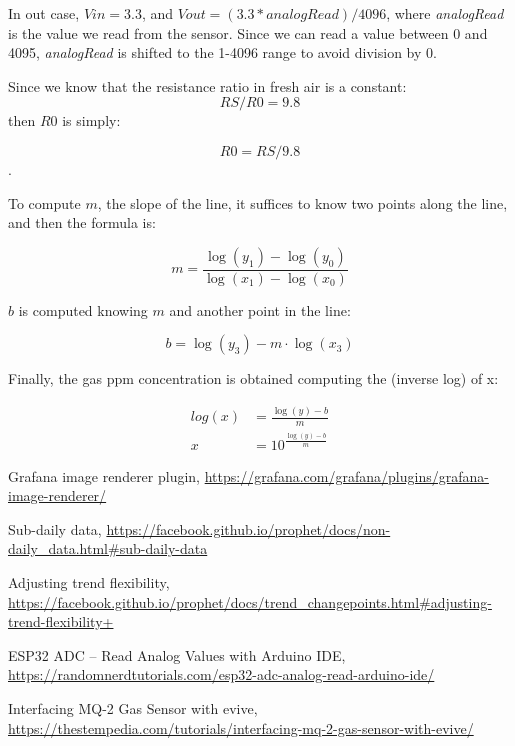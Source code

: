\documentclass[]{article}
\begin{document}
In out case, $ Vin = 3.3 $, and $ Vout = (3.3*analogRead)/4096 $, where \textit{analogRead} is the value we read from the sensor. Since we can read a value between 0 and 4095, \textit{analogRead} is shifted to the 1-4096 range to avoid division by 0. 

Since we know that the resistance ratio in fresh air is a constant: 
$$RS / R0 = 9.8$$
then $ R0 $ is simply:

$$ R0 = RS / 9.8 $$.

To compute $ m $, the slope of the line, it suffices to know two points along the line, and then the formula is:

$$ m = \frac{\log(y_1) - \log(y_0)} {\log(x_1) - \log(x_0)} $$

$ b $ is computed knowing $ m $ and another point in the line:

$$ b = \log(y_3) - m \cdot \log(x_3) $$

Finally, the gas ppm concentration is obtained computing the (inverse log) of x:

\begin{align*}
	log(x) & = 	\frac{\log(y) - b}{m} \\
	x &  = 10 ^ {\frac{\log(y) - b } {m}}
\end{align*}

\begin{thebibliography}{9}
	
	 Grafana image renderer plugin, \url{https://grafana.com/grafana/plugins/grafana-image-renderer/}
	
	 Sub-daily data, \url{https://facebook.github.io/prophet/docs/non-daily_data.html#sub-daily-data}
	
	 Adjusting trend flexibility, \url{https://facebook.github.io/prophet/docs/trend_changepoints.html#adjusting-trend-flexibility+}
	
	 ESP32 ADC – Read Analog Values with Arduino IDE,  \url{https://randomnerdtutorials.com/esp32-adc-analog-read-arduino-ide/}
	
	 Interfacing MQ-2 Gas Sensor with evive,  \url{https://thestempedia.com/tutorials/interfacing-mq-2-gas-sensor-with-evive/}
	
\end{thebibliography}
\end{document}
